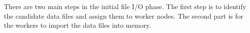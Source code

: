 There are two main steps in the initial file I/O phase. The first step is to identify the candidate data files and assign them to worker nodes. The second part is for the workers to import the data files into memory.
